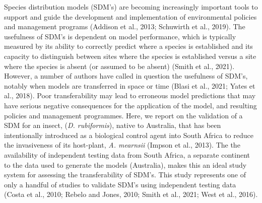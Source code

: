 \documentclass[12pt,]{article}
\begin{document}
Species distribution models (SDM's) are becoming increasingly important
tools to support and guide the development and implementation of
environmental policies and management programs (Addison et al., 2013;
Schuwirth et al., 2019). The usefulness of SDM's is dependent on model
performance, which is typically measured by its ability to correctly
predict where a species is established and its capacity to distinguish
between sites where the species is established versus a site where the
species is absent (or assumed to be absent) (Smith et al., 2021).
However, a number of authors have called in question the usefulness of
SDM's, notably when models are transferred in space or time (Blasi et
al., 2021; Yates et al., 2018). Poor transferability may lead to
erroneous model predictions that may have serious negative consequences
for the application of the model, and resulting policies and management
programmes. Here, we report on the validation of a SDM for an insect,
(\emph{D. rubiformis}), native to Australia, that has been intentionally
introduced as a biological control agent into South Africa to reduce the
invasiveness of its host-plant, \emph{A. mearnsii} (Impson et al.,
2013). The the availability of independent testing data from South
Africa, a separate continent to the data used to generate the models
(Australia), makes this an ideal study system for assessing the
transferability of SDM's. This study represents one of only a handful of
studies to validate SDM's using independent testing data (Costa et al.,
2010; Rebelo and Jones, 2010; Smith et al., 2021; West et al., 2016).
\end{document}
